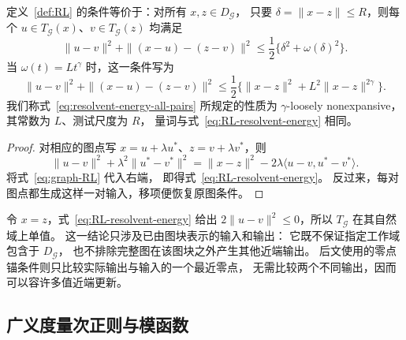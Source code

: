 \begin{lemma}[RL 的等价近端条件]
\label{lem:RL-J}
\label{lem:minty-equivalence}
定义~\ref{def:RL} 的条件等价于：对所有 $x,z\in D_{\mathcal G}$，
只要 $\delta=\|x-z\|\le R$，则每个
$u\in T_{\mathcal G}(x)$、$v\in T_{\mathcal G}(z)$ 均满足
\begin{equation}
 \|u-v\|^2+\|(x-u)-(z-v)\|^2
 \le\frac12\bigl\{\delta^2+\omega(\delta)^2\bigr\}.
 \label{eq:RL-resolvent-energy}
\end{equation}
当 $\omega(t)=Lt^\gamma$ 时，这一条件写为
\begin{equation}
 \|u-v\|^2+\|(x-u)-(z-v)\|^2
 \le\frac12\bigl\{\|x-z\|^2+L^2\|x-z\|^{2\gamma}\bigr\}.
 \label{eq:resolvent-energy-all-pairs}
\end{equation}
我们称式~\eqref{eq:resolvent-energy-all-pairs} 所规定的性质为
$\gamma$-loosely nonexpansive，其常数为 $L$、测试尺度为 $R$，
量词与式~\eqref{eq:RL-resolvent-energy} 相同。
\end{lemma}

\begin{proof}
对相应的图点写 $x=u+\lambda u^*$、$z=v+\lambda v^*$，则
\[
 \|u-v\|^2+\lambda^2\|u^*-v^*\|^2
 =\|x-z\|^2-2\lambda\langle u-v,u^*-v^*\rangle.
\]
将式~\eqref{eq:graph-RL} 代入右端，
即得式~\eqref{eq:RL-resolvent-energy}。
反过来，每对图点都生成这样一对输入，移项便恢复原图条件。
\end{proof}

令 $x=z$，式~\eqref{eq:RL-resolvent-energy} 给出
$2\|u-v\|^2\le0$，所以 $T_{\mathcal G}$ 在其自然域上单值。
这一结论只涉及已由图块表示的输入和输出：
它既不保证指定工作域包含于 $D_{\mathcal G}$，
也不排除完整图在该图块之外产生其他近端输出。
后文使用的零点锚条件则只比较实际输出与输入的一个最近零点，
无需比较两个不同输出，因而可以容许多值近端更新。

\subsection{广义度量次正则与模函数}
\label{subsec:true-error-bound}

